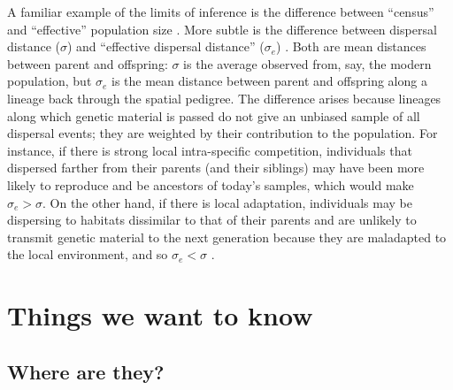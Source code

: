\documentclass{ar-1col}
\begin{document}
A familiar example of the limits of inference 
is the difference between ``census'' and ``effective'' population size \citep{Wright_1931,Charlesworth2009}.
More subtle is the difference between dispersal distance ($\sigma$) and
``effective dispersal distance'' ($\sigma_e$) \citep[reviewed in][]{Cayuela2018demographic}.
Both are mean distances between parent and offspring:
$\sigma$ is the average observed from, say, the modern population,
but $\sigma_e$ is
the mean distance between parent and offspring along a lineage back through the spatial pedigree.
The difference arises because
lineages along which genetic material is passed do not give an unbiased sample of all dispersal events;
they are weighted by their contribution to the population.
For instance, if there is strong local intra-specific competition,
individuals that dispersed farther from their parents (and their siblings)
may have been more likely to reproduce and be ancestors of today's samples,
which would make $\sigma_e > \sigma$.
On the other hand, if there is local adaptation,
individuals may be dispersing to habitats dissimilar to that of their parents
and are unlikely to transmit genetic material to the next generation
because they are maladapted to the local environment,
and so $\sigma_e < \sigma$
\citep[for a review, see][]{wangbradburd2014}.


\section{Things we want to know}

\subsection{Where are they?}
\end{document}
